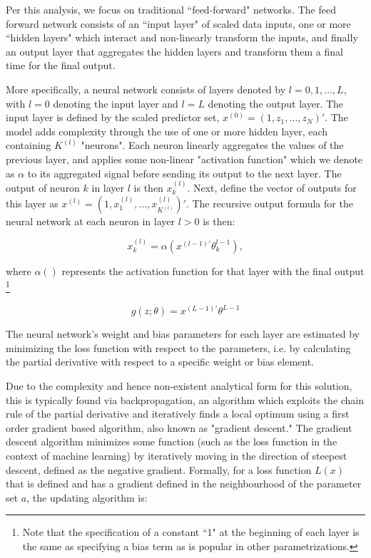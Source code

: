 \documentclass[11pt, a4paper, table]{article}
\begin{document}
Per this analysis, we focus on traditional ``feed-forward" networks. The feed forward network consists of an ``input layer" of scaled data inputs, one or more ``hidden layers" which interact and non-linearly transform the inputs, and finally an output layer that aggregates the hidden layers and transform them a final time for the final output. 

More specifically, a neural network consists of layers denoted by $l = 0, 1, \dots, L$, with $l = 0$ denoting the input layer and $l = L$ denoting the output layer. The input layer is defined by the scaled predictor set, $x^{(0)} = (1, z_1, \dots, z_N)'$. The model adds complexity through the use of one or more hidden layer, each containing $K^{(l)}$ "neurons". Each neuron linearly aggregates the values of the previous layer, and applies some non-linear "activation function" which we denote as $\alpha$ to its aggregated signal before sending its output to the next layer. The output of neuron $k$ in layer $l$ is then $x_k^{(l)}$. Next, define the vector of outputs for this layer as $x^{(l)} = (1, x_1^{(l)}, \dots, x_{K^(l)}^{(l)})'$.  The recursive output formula for the neural network at each neuron in layer $l > 0$ is then:

\begin{equation}
x_k^{(l)} = \alpha(x^{(l-1)'}\theta_k^{l-1}),
\end{equation}

where $\alpha()$ represents the activation function for that layer with the final output \footnote{Note that the specification of a constant ``1" at the beginning of each layer is the same as specifying a bias term as is popular in other parametrizations. }

\begin{equation}
g(z;\theta) = x^{(L-1)'}\theta^{L-1}
\end{equation}

The neural network's weight and bias parameters for each layer are estimated by minimizing the loss function with respect to the parameters, i.e. by calculating the partial derivative with respect to a specific weight or bias element. 

Due to the complexity and hence non-existent analytical form for this solution, this is typically found via backpropagation, an algorithm which exploits the chain rule of the partial derivative and iteratively finds a local optimum using a first order gradient based algorithm, also known as "gradient descent." The gradient descent algorithm minimizes some function (such as the loss function in the context of machine learning) by iteratively moving in the direction of steepest descent, defined as the negative gradient. Formally, for a loss function $L(x)$ that is defined and has a gradient defined in the neighbourhood of the parameter set $a$, the updating algorithm is:
\end{document}

